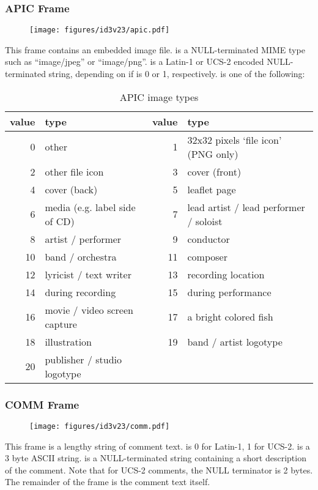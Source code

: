 \subsubsection{APIC Frame}
\begin{figure}[h]
\texttt{[image: figures/id3v23/apic.pdf]}
\end{figure}
This frame contains an embedded image file.
 is a NULL-terminated MIME type such as ``image/jpeg''
or ``image/png''.
 is a Latin-1 or UCS-2 encoded NULL-terminated string,
depending on if  is 0 or 1, respectively.
 is one of the following:
\begin{table}[h]
{
\begin{tabular}{|r|l||r|l|}
\hline
value & type & value & type \\
\hline
0 & other & 1 & 32x32 pixels `file icon' (PNG only) \\
2 & other file icon & 3 & cover (front) \\
4 & cover (back) & 5 & leaflet page \\
6 & media (e.g. label side of CD) & 7 & lead artist / lead performer / soloist \\
8 & artist / performer & 9 & conductor \\
10 & band / orchestra & 11 & composer \\
12 & lyricist / text writer & 13 & recording location \\
14 & during recording & 15 & during performance \\
16 & movie / video screen capture & 17 & a bright colored fish \\
18 & illustration & 19 & band / artist logotype \\
20 & publisher / studio logotype & &  \\
\hline
\end{tabular}
\caption{APIC image types}
}
\end{table}

\subsubsection{COMM Frame}
\begin{figure}[h]
\texttt{[image: figures/id3v23/comm.pdf]}
\end{figure}
This frame is a lengthy string of comment text.
 is 0 for Latin-1, 1 for UCS-2.
 is a 3 byte ASCII string.
 is a NULL-terminated string
containing a short description of the comment.
Note that for UCS-2 comments, the NULL terminator is 2 bytes.
The remainder of the frame is the comment text itself.

